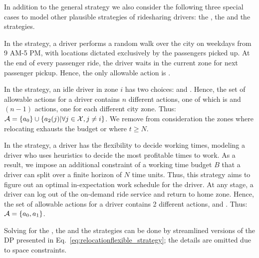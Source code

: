 { In addition to the general {\relocationflexible} strategy we also
consider the following three special cases to model other plausible strategies of ridesharing drivers: 
the {\naive}, the {\relocation} and the {\flexible} strategies.

In the {\naive} strategy, a driver performs a random walk over the city on weekdays from 9 AM-5 PM, with locations dictated exclusively by the passengers picked up. At the end of every passenger ride, the driver waits in the current zone for next passenger pickup. 
Hence, the only allowable action is {\getpassenger}.

In the {\relocation} strategy, an idle driver in zone $i$ has two choices: {\getpassenger} and {\relocate}. Hence, the set of allowable actions for a driver contains $n$ different actions, one of which is {\getpassenger} and $(n-1)$ {\relocate} actions, one for each different city zone.  Thus: $
\mathcal{A} =  \{a_0\} \cup \{a_2(j) | \forall j \in \mathcal{X}, j \neq i \}
$.
We remove from consideration the zones where relocating exhausts the budget or where $t \geq N$.

In the {\flexible} strategy, a driver has the flexibility to decide working times, modeling a driver who uses heuristics to decide the most profitable times to work.   As a result, we impose an additional constraint of a working time budget $B$ that a driver can split over a finite horizon of $N$ time units. Thus, this strategy aims to figure out an optimal 
in-expectation work schedule for the driver.  
At any stage, a driver can log out of the on-demand ride service and return to home zone. Hence, the set of allowable actions for a driver contains 2 different actions, {\getpassenger} and {\gohome}.  Thus: $
\mathcal{A} = \{a_0, a_1\}$.

Solving {\originalproblem} for the {\naive}, the {\relocation} and the
{\flexible} strategies can be done by streamlined versions of the DP presented in 
Eq.~\eqref{eq:relocationflexible_strategy}; the details
are omitted due to space constraints.


\begin{comment}
\iffalse
We now consider strategic behavior, modeled through a set of strategies for how 
a rational Uber driver might undertake to maximize profit over the course of a 
40-hour workweek.  


\end{comment}}
